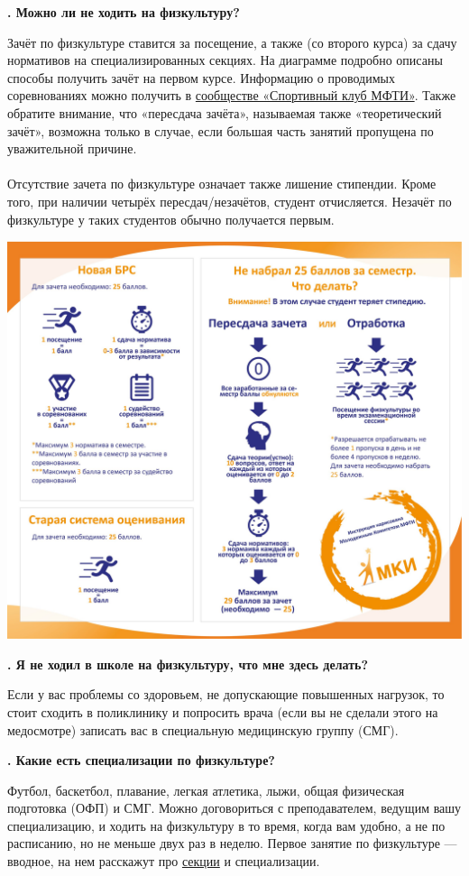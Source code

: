 \documentclass[14pt]{extarticle}
\newcounter{question}
\newcommand\Que[1]{%
    \begin{minipage}{\textwidth}
    \leavevmode\par
    \stepcounter{question}
    \noindent
    {\large\textbf{\thequestion. #1}}\par}
\newcommand\Ans[2][]{%
    \leavevmode\par\noindent
    {\leftskip37pt
    \textbf{#1}#2\par}
    \end{minipage}}
\newcommand\Partans[2][]{%
    \leavevmode\par\noindent
    {\leftskip37pt
    \textbf{#1}#2\par}}
\begin{document}
\Que{Можно ли не ходить на физкультуру?}
\Partans{Зачёт по физкультуре ставится за посещение, а также (со второго курса) за сдачу нормативов на специализированных секциях. На диаграмме подробно описаны способы получить зачёт на первом курсе. Информацию о проводимых соревнованиях можно получить в \href{https://vk.com/miptsport}{сообществе «Спортивный клуб МФТИ»}. Также обратите внимание, что «пересдача зачёта», называемая также «теоретический зачёт», возможна только в случае, если большая часть занятий пропущена по уважительной причине. \\ \\  Отсутствие зачета по физкультуре означает также лишение стипендии. Кроме того, при наличии четырёх пересдач/незачётов, студент отчисляется. Незачёт по физкультуре у таких студентов обычно получается первым. }
\includegraphics[width = 150 mm]{resources/fizra.jpg}
\end{minipage}

\Que{Я не ходил в школе на физкультуру, что мне здесь делать?}
\Ans{Если у вас проблемы со здоровьем, не допускающие повышенных нагрузок, то стоит сходить в поликлинику и попросить врача (если вы не сделали этого на медосмотре) записать вас в специальную медицинскую группу (СМГ).}

\Que{Какие есть специализации по физкультуре?}
\Ans{Футбол, баскетбол, плавание, легкая атлетика, лыжи, общая физическая подготовка (ОФП) и СМГ. Можно договориться с преподавателем, ведущим вашу специализацию, и ходить на физкультуру в то время, когда вам удобно, а не по расписанию, но не меньше двух раз в неделю. Первое занятие по физкультуре — вводное, на нем расскажут про \href{https://vk.com/page-17708_53470575}{секции} и специализации.}
\end{document}
